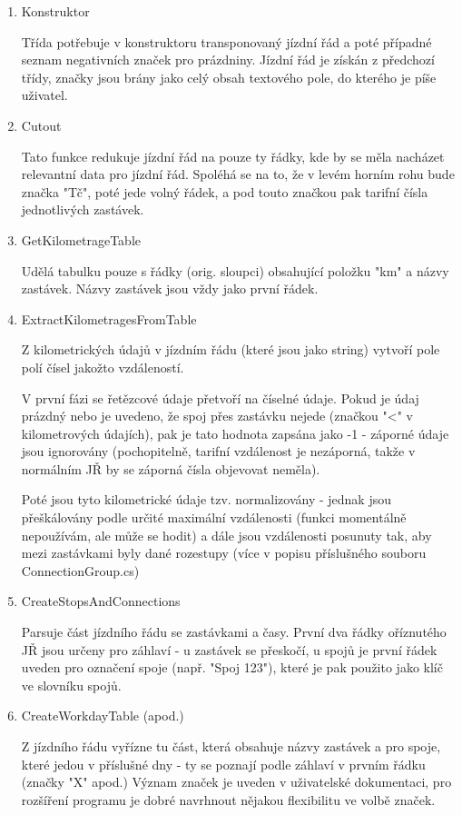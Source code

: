 \documentclass[14pt]{article}
\begin{document}
\begin{enumerate}
\item Konstruktor

Třída potřebuje v konstruktoru transponovaný jízdní řád a poté případné seznam negativních značek pro prázdniny. Jízdní řád je získán z předchozí třídy, značky jsou brány jako celý obsah textového pole, do kterého je píše uživatel.

\item Cutout

Tato funkce redukuje jízdní řád na pouze ty řádky, kde by se měla nacházet relevantní data pro jízdní řád. Spoléhá se na to, že v levém horním rohu bude značka "Tč", poté jede volný řádek, a pod touto značkou pak tarifní čísla jednotlivých zastávek. 

\item GetKilometrageTable

Udělá tabulku pouze s řádky (orig. sloupci) obsahující položku "km" a názvy zastávek. Názvy zastávek jsou vždy jako první řádek.

\item ExtractKilometragesFromTable

Z kilometrických údajů v jízdním řádu (které jsou jako string) vytvoří pole polí čísel jakožto vzdáleností.

V první fázi se řetězcové údaje přetvoří na číselné údaje. Pokud je údaj prázdný nebo je uvedeno, že spoj přes zastávku nejede (značkou "<" v kilometrových údajích), pak je tato hodnota zapsána jako -1 - záporné údaje jsou ignorovány (pochopitelně, tarifní vzdálenost je nezáporná, takže v normálním JŘ by se záporná čísla objevovat neměla).

Poté jsou tyto kilometrické údaje tzv. normalizovány - jednak jsou přeškálovány podle určité maximální vzdálenosti (funkci momentálně nepoužívám, ale může se hodit) a dále jsou vzdálenosti posunuty tak, aby mezi zastávkami byly dané rozestupy (více v popisu příslušného souboru ConnectionGroup.cs)

\item CreateStopsAndConnections

Parsuje část jízdního řádu se zastávkami a časy. První dva řádky oříznutého JŘ jsou určeny pro záhlaví - u zastávek se přeskočí, u spojů je první řádek uveden pro označení spoje (např. "Spoj 123"), které je pak použito jako klíč ve slovníku spojů.

\item CreateWorkdayTable (apod.)

Z jízdního řádu vyřízne tu část, která obsahuje názvy zastávek a pro spoje, které jedou v příslušné dny - ty se poznají podle záhlaví v prvním řádku (značky "X" apod.) Význam značek je uveden v uživatelské dokumentaci, pro rozšíření programu je dobré navrhnout nějakou flexibilitu ve volbě značek.

\end{enumerate}
\end{document}
